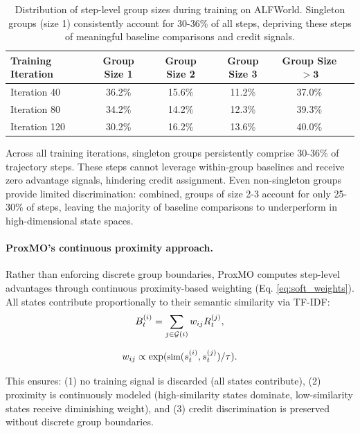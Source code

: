 \documentclass[11pt]{article}
\begin{document}
\begin{table}[h]
\centering
\small
\begin{tabular}{lccccc}
\toprule
\textbf{Training Iteration} & \textbf{Group Size 1} & \textbf{Group Size 2} & \textbf{Group Size 3} & \textbf{Group Size} $\bm{>3}$ \\
\midrule
Iteration 40 & 36.2\% & 15.6\% & 11.2\% & 37.0\% \\
Iteration 80 & 34.2\% & 14.2\% & 12.3\% & 39.3\% \\
Iteration 120 & 30.2\% & 16.2\% & 13.6\% & 40.0\% \\
\bottomrule
\end{tabular}
\caption{Distribution of step-level group sizes during training on ALFWorld. Singleton groups (size 1) consistently account for 30-36\% of all steps, depriving these steps of meaningful baseline comparisons and credit signals.}
\label{tab:group_size_distribution}
\end{table}

Across all training iterations, singleton groups persistently comprise 30-36\% of trajectory steps. These steps cannot leverage within-group baselines and receive zero advantage signals, hindering credit assignment. Even non-singleton groups provide limited discrimination: combined, groups of size 2-3 account for only 25-30\% of steps, leaving the majority of baseline comparisons to underperform in high-dimensional state spaces.

\paragraph{ProxMO's continuous proximity approach.}
Rather than enforcing discrete group boundaries, ProxMO computes step-level advantages through continuous proximity-based weighting (Eq. \ref{eq:soft_weights}). All states contribute proportionally to their semantic similarity via TF-IDF:
\begin{equation}
\small
B_t^{(i)} = \sum_{j \in \mathcal{G}(i)} w_{ij} R_t^{(j)},
\end{equation}

\begin{equation}
\small
w_{ij} \propto \exp(\text{sim}(s_t^{(i)}, s_t^{(j)}) / \tau).
\end{equation}

This ensures: (1) no training signal is discarded (all states contribute), (2) proximity is continuously modeled (high-similarity states dominate, low-similarity states receive diminishing weight), and (3) credit discrimination is preserved without discrete group boundaries.
\end{document}
